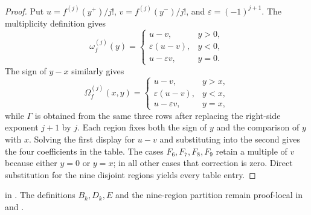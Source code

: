 \begin{proof}
\leanok
Put $u=f^{(j)}(y^+)/j!$, $v=f^{(j)}(y^-)/j!$, and
$\varepsilon=(-1)^{j+1}$.  The multiplicity definition gives
\[
\omega_f^{(j)}(y)=
\begin{cases}u-v,&y>0,\\
\varepsilon(u-v),&y<0,\\
u-\varepsilon v,&y=0.
\end{cases}
\]
The sign of $y-x$ similarly gives
\[
\Omega_f^{(j)}(x,y)=
\begin{cases}u-v,&y>x,\\
\varepsilon(u-v),&y<x,\\
u-\varepsilon v,&y=x,
\end{cases}
\]
while $\Gamma$ is obtained from the same three rows after replacing the
right-side exponent $j+1$ by $j$.  Each region fixes both the sign of $y$ and
the comparison of $y$ with $x$.  Solving the first display for $u-v$ and
substituting into the second gives the four coefficients in the table.  The
cases $F_6,F_7,F_8,F_9$ retain a multiple of $v$ because either $y=0$ or
$y=x$; in all other cases that correction is zero.  Direct substitution for
the nine disjoint regions yields every table entry.
\end{proof}

\begin{leanproof}
 in
.  The definitions $B_k,D_k,E$ and the
nine-region partition remain proof-local in  and
.
\end{leanproof}

